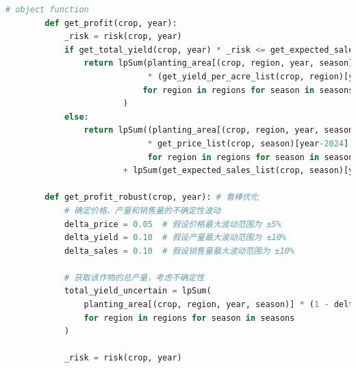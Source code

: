 \documentclass{cumcmthesis}
\begin{document}
\begin{appendices}
\begin{lstlisting}[language=python]
        # object function
        def get_profit(crop, year):
            _risk = risk(crop, year)
            if get_total_yield(crop, year) * _risk <= get_expected_sales_list(crop, '第一季')[year-2024] + get_expected_sales_list(crop, '第二季')[year-2024]:
                return lpSum(planting_area[(crop, region, year, season)]
                             * (get_yield_per_acre_list(crop, region)[year-2024] * get_price_list(crop, season)[year-2024] * _risk - get_cost_list(crop, region)[year-2024])
                            for region in regions for season in seasons
                        )
            else:
                return lpSum((planting_area[(crop, region, year, season)] * get_yield_per_acre_list(crop, region)[year-2024] - get_expected_sales_list(crop, season)[year-2024] - get_cost_list(crop, region)[year-2024])
                             * get_price_list(crop, season)[year-2024] * (1 - reduction_factor) 
                             for region in regions for season in seasons) \
                        + lpSum(get_expected_sales_list(crop, season)[year-2024] * get_price_list(crop, season)[year-2024] for season in seasons)
    
        def get_profit_robust(crop, year): # 鲁棒优化
            # 确定价格、产量和销售量的不确定性波动
            delta_price = 0.05  # 假设价格最大波动范围为 ±5%
            delta_yield = 0.10  # 假设产量最大波动范围为 ±10%
            delta_sales = 0.10  # 假设销售量最大波动范围为 ±10%
    
            # 获取该作物的总产量，考虑不确定性
            total_yield_uncertain = lpSum(
                planting_area[(crop, region, year, season)] * (1 - delta_yield) * get_yield_per_acre_list(crop, region)[year - 2024]
                for region in regions for season in seasons
            )
    
            _risk = risk(crop, year)
    

\end{lstlisting}
\end{appendices}
\end{document}
